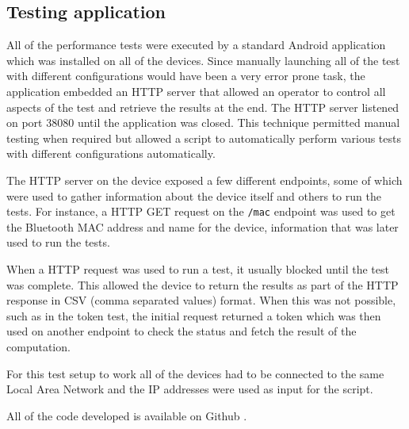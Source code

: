 \subsection{Testing application}
All of the performance tests were executed by a standard Android application which was installed on all of the devices.
Since manually launching all of the test with different configurations would have been a very error prone task, the application embedded an HTTP server that allowed an operator to control all aspects of the test and retrieve the results at the end.
The HTTP server listened on port $38080$ until the application was closed.
This technique permitted manual testing when required but allowed a script to automatically perform various tests with different configurations automatically.

The HTTP server on the device exposed a few different endpoints, some of which were used to gather information about the device itself and others to run the tests.
For instance, a HTTP GET request on the \texttt{/mac} endpoint was used to get the Bluetooth MAC address and name for the device, information that was later used to run the tests.

When a HTTP request was used to run a test, it usually blocked until the test was complete. This allowed the device to return the results as part of the HTTP response in CSV (comma separated values) format.
When this was not possible, such as in the token test, the initial request returned a token which was then used on another endpoint to check the status and fetch the result of the computation.

For this test setup to work all of the devices had to be connected to the same Local Area Network and the IP addresses were used as input for the script. 

All of the code developed is available on Github \cite{test-code}.